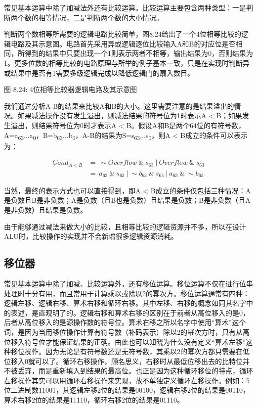 \documentclass[]{ctexbook}
\begin{document}
常见基本运算中除了加减法外还有比较运算。比较运算主要包含两种类型：一是判断两个数的相等情况，二是判断两个数的大小情况。

判断两个数相等所需要的逻辑电路比较简单，图8.24给出了一个4位相等比较的逻辑电路及其示意图。电路首先采用异或逻辑逐位比较输入A和B的对应位是否相同，所得到的结果中只要出现一个1则表示两者不相等，输出结果为0，否则结果为1。更多位数的相等比较的电路原理与所举的例子基本一致，只是在实现时判断异或结果中是否有1需要多级逻辑完成以降低逻辑门的扇入数目。

图 8.24: 4位相等比较器逻辑电路及其示意图

我们通过分析A-B的结果来比较A和B的大小。这里需要注意的是结果溢出的情况。如果减法操作没有发生溢出，则减法结果的符号位为1时表示A \textless{} B；如果发生溢出，则结果符号位为0时才表示A \textless{} B。假设A和B是两个64位的有符号数，A=a\textsubscript{63}\(\ldots\)a\textsubscript{0}，B=b\textsubscript{63}\(\ldots\)b\textsubscript{0}，A-B的结果为S=s\textsubscript{63}\(\ldots\)s\textsubscript{0}，则A \textless{} B成立的条件可以表示为：

\[\begin{aligned}Cond_{A< B}&=\ \sim Overflow \ \&\ s_{63} \ |\ Overflow \ \&\ s_{63} \\ &=\ a_{63}\ \&\ s_{63}\ |\ \sim b_{63}\ \&\ s_{63}\ |\ a_{63}\ \&\ \sim b_{63}\end{aligned}\]

当然，最终的表示方式也可以直接得到，即A \textless{} B成立的条件仅包括三种情况：A是负数且B是非负数；A是负数（且B也是负数）且结果是负数；B是非负数（且A是非负数）且结果是负数。

由于能够通过减法来做大小的比较，且相等比较的逻辑资源并不多，所以在设计ALU时，比较操作的实现并不会新增很多逻辑资源消耗。

\hypertarget{ux79fbux4f4dux5668}{%
\subsection{移位器}\label{ux79fbux4f4dux5668}}

常见基本运算中除了加减、比较运算外，还有移位运算。移位运算不仅在进行位串处理时十分有用，而且常用于计算乘以或除以2的幂次方。移位运算通常有四种：逻辑左移、逻辑右移、算术右移和循环右移。其中左移、右移的概念如同其名字中的表述，是直观明了的。逻辑右移和算术右移的区别在于前者从高位移入的是0，后者从高位移入的是源操作数的符号位。算术右移之所以名字中使用``算术''这个词，是因为当用移位操作计算有符号数（补码表示）除以2的幂次方时，只有从高位移入符号位才能保证结果的正确。由此也可以知晓为什么没有定义``算术左移''这种移位操作。因为无论是有符号数还是无符号数，其乘以2的幂次方都只需要在低位移入0就可以了。循环右移操作，顾名思义，右移时从最低位移出去的比特位并不被丢弃，而是重新填入到结果的最高位。也正是因为这种循环移位的特点，循环左移操作其实可以用循环右移操作来实现，故不单独定义循环左移操作。例如：5位二进制数11001，其逻辑左移2位的结果是00100，逻辑右移2位的结果是00110，算术右移2位的结果是11110，循环右移2位的结果是01110。
\end{document}
